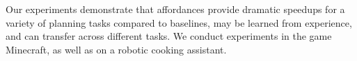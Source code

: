 \documentclass[conference]{IEEEtran}
\newcommand{\stnote}[1]{\textcolor{Blue}{\textbf{ST: #1}}}
\begin{document}
Our experiments demonstrate that affordances provide dramatic speedups for a variety
of planning tasks compared to baselines, may be learned from
experience, and can transfer across different tasks.  We conduct experiments
in the game Minecraft, as well as on a robotic cooking assistant. 








\end{document}
